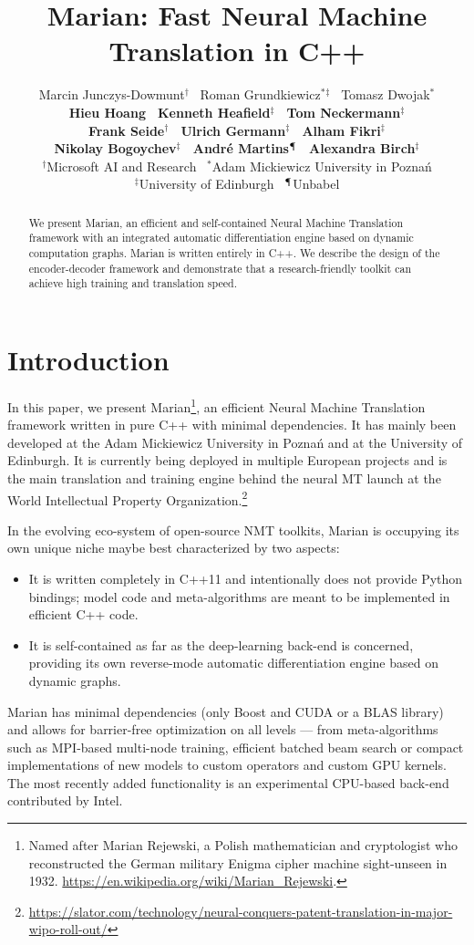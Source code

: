 \documentclass[11pt,a4paper]{article}
\title{Marian: Fast Neural Machine Translation in C++}
\author{Marcin Junczys-Dowmunt$^{\dagger}$ \, Roman Grundkiewicz$^{*}$$^{\ddagger}$ \, Tomasz Dwojak$^{*}$ \\ {\bf Hieu Hoang \, Kenneth Heafield$^{\ddagger}$ \, Tom Neckermann$^{\ddagger}$ }  \\  {\bf Frank Seide$^{\dagger}$ \, Ulrich Germann$^{\ddagger}$ \, Alham Fikri$^{\ddagger}$ } \\ { \bf Nikolay Bogoychev$^{\ddagger}$ \, Andr\'{e} Martins$^{\mathparagraph}$ \, Alexandra Birch$^{\ddagger}$} \\[2mm]
$^{\dagger}$Microsoft AI and Research \, $^{*}$Adam Mickiewicz University in Pozna\'{n} \\ $^{\ddagger}$University of Edinburgh \,  $^{\mathparagraph}$Unbabel }
\date{}
\begin{document}
\maketitle
\begin{abstract}
We present Marian, an efficient and self-contained Neural Machine Translation framework with an integrated automatic differentiation engine based on dynamic computation graphs. Marian is written entirely in C++. We describe the design of the encoder-decoder framework and demonstrate that a research-friendly toolkit can achieve high training and translation speed.  
\end{abstract}

\section{Introduction}

In this paper, we present Marian\footnote{Named after Marian Rejewski, a Polish mathematician and cryptologist who reconstructed the German military Enigma cipher machine sight-unseen in 1932. \url{https://en.wikipedia.org/wiki/Marian_Rejewski}.}, an efficient Neural Machine Translation framework written in pure C++ with minimal dependencies. It has mainly been developed at the Adam Mickiewicz University in Pozna\'{n} and at the University of Edinburgh. It is currently being deployed in multiple European projects and is the main translation and training engine behind the neural MT launch at the World Intellectual Property Organization.\footnote{\url{https://slator.com/technology/neural-conquers-patent-translation-in-major-wipo-roll-out/}}

In the evolving eco-system of open-source NMT toolkits, Marian is occupying its own unique niche maybe best characterized by two aspects: 
\begin{itemize}
\item It is written completely in C++11 and intentionally does not provide Python bindings; model code and meta-algorithms are meant to be implemented in efficient C++ code.
\item It is self-contained as far as the deep-learning back-end is concerned, providing its own reverse-mode automatic differentiation engine based on dynamic graphs.
\end{itemize}

Marian has minimal dependencies (only Boost and CUDA or a BLAS library) and allows for barrier-free optimization on all levels --- from meta-algorithms such as MPI-based multi-node training, efficient batched beam search or compact implementations of new models to custom operators and custom GPU kernels. The most recently added functionality is an experimental CPU-based back-end contributed by Intel. 
\end{document}
